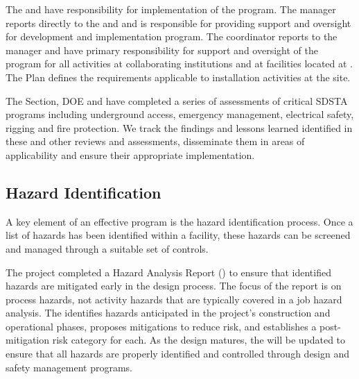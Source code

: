 The  and  have responsibility for
implementation of the   program.  The
  manager reports directly to the
 and  and is responsible for providing
 support and oversight for development and implementation
  program. The  
coordinator reports to the  
manager and have primary responsibility for  support and
oversight of the   program for all activities
at collaborating institutions and at 
facilities located at . The   Plan defines the 
requirements applicable to installation activities at the 
site. 


The \fnal {} Section, DOE and
  have completed a series of assessments of
critical SDSTA  programs including underground access,
emergency management, electrical safety, rigging and fire
protection. We track the findings and lessons learned identified in these
 and other reviews and assessments, 
disseminate them in areas of applicability and ensure their appropriate implementation.

\subsection{Hazard Identification}
\label{sec:es-tc-eshq-har}

A key element of an effective  program is the hazard
identification process. 
Once a list of hazards has been identified within a facility, these hazards can be screened
and managed through a suitable set of controls.

The  project completed a Hazard Analysis Report ()
to ensure that identified hazards are mitigated early in the
design process.  The focus of the report is on process hazards,
not activity hazards that are typically covered in a job hazard
analysis.  The   identifies
hazards anticipated in the project's construction and operational
phases, proposes mitigations to reduce risk, and establishes a
post-mitigation risk category for each.  As the  design 
matures, the  will be
updated to ensure that all hazards are properly identified and
controlled through design and safety management programs.

